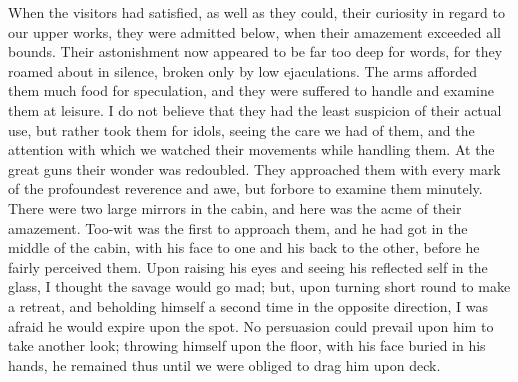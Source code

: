 When the visitors had satisfied, as well as they could, their curiosity in
regard to our upper works, they were admitted below, when their amazement
exceeded all bounds. Their astonishment now appeared to be far too deep for
words, for they roamed about in silence, broken only by low ejaculations. The
arms afforded them much food for speculation, and they were suffered to handle
and examine them at leisure. I do not believe that they had the least suspicion
of their actual use, but rather took them for idols, seeing the care we had of
them, and the attention with which we watched their movements while handling
them. At the great guns their wonder was redoubled. They approached them with
every mark of the profoundest reverence and awe, but forbore to examine them
minutely. There were two large mirrors in the cabin, and here was the acme of
their amazement. Too-wit was the first to approach them, and he had got in the
middle of the cabin, with his face to one and his back to the other, before he
fairly perceived them. Upon raising his eyes and seeing his reflected self in
the glass, I thought the savage would go mad; but, upon turning short round to
make a retreat, and beholding himself a second time in the opposite direction, I
was afraid he would expire upon the spot. No persuasion could prevail upon him
to take another look; throwing himself upon the floor, with his face buried in
his hands, he remained thus until we were obliged to drag him upon deck. 


